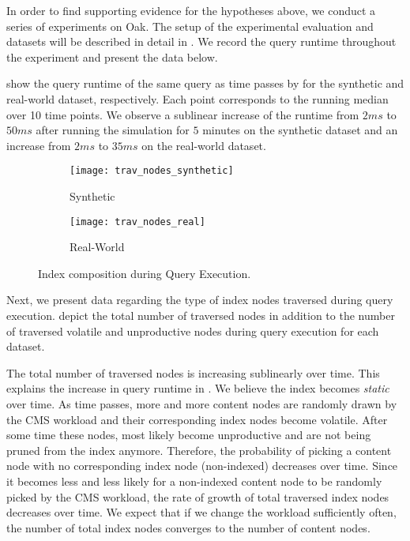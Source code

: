 \documentclass[abstracton,12pt]{scrartcl}
\theoremstyle{definition}
\begin{document}
In order to find supporting evidence for the hypotheses above, we conduct a series of
experiments on Oak. The setup of the  experimental evaluation and
datasets will be described in detail in . We
record the query runtime throughout the experiment and present the data below.

 show the 
query runtime of the same query as time passes by for the synthetic and
real-world dataset, respectively. 
Each point corresponds to the running median \cite{running-median} over 10 time points.
We observe a sublinear increase of the runtime from $2 ms$ to $50 ms$
after running the simulation for $5$ minutes
on the synthetic dataset and an increase from $2 ms$ to $35 ms$ on the
real-world dataset. 

\begin{figure}[!ht]
  \centering
  \begin{subfigure}{0.49\linewidth}
    \centering
    \caption{Synthetic}
    \texttt{[image: trav\_nodes\_synthetic]}
    \label{fig:trav_nodes_synthetic}
  \end{subfigure}
  \begin{subfigure}{0.49\linewidth}
    \centering
    \caption{Real-World}
    \texttt{[image: trav\_nodes\_real]}
    \label{fig:trav_nodes_real}
  \end{subfigure}
  \vspace{-0.5cm}
  \caption{Index composition during Query Execution.}
  \label{fig:trav_nodes}
\end{figure}

Next, we present data regarding the type of index nodes traversed during query
execution.
 depict
the total number of traversed nodes in addition to the number of traversed
volatile and unproductive nodes during query execution for each dataset.

The total number of traversed nodes is increasing sublinearly over time. This
explains the increase in query runtime in
.
We believe the index becomes \textit{static} over time.
As time passes, more and more content nodes are randomly
drawn by the CMS workload and their corresponding index nodes become
volatile. After some time these nodes, most likely become unproductive and are
not  being pruned from the index anymore.
Therefore, the probability of picking a content node with no corresponding index
node (non-indexed)
decreases over time. Since it becomes less and less likely for a non-indexed content node
to be randomly picked by the CMS workload, the rate of growth of total traversed
index nodes decreases over time. We expect that if we change the workload
sufficiently often, the number of total index nodes converges to the number of
content nodes.
\end{document}
